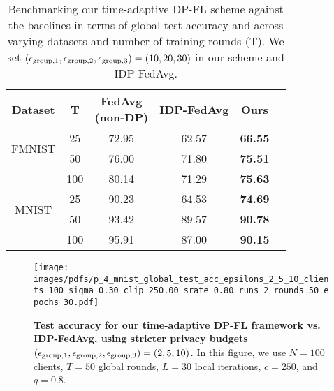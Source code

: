 {\begin{table}[h!]
\centering
\caption{
{Benchmarking our time-adaptive DP-FL scheme against the baselines in terms of global test accuracy and across varying datasets and number of training rounds (T). We set $({\epsilon}_{\text{group},1}, {\epsilon}_{\text{group},2}, {\epsilon}_{\text{group},3})=(10,20,30)$ in our scheme and IDP-FedAvg.}}
\small 
\setlength{\tabcolsep}{8pt} 
\renewcommand{\arraystretch}{1.2} 
\begin{tabular}{cccccc}
\toprule
\textbf{Dataset} & \textbf{T} & \makecell[tl]{\textbf{FedAvg} \\ (non-DP)} & \textbf{IDP-FedAvg} & \textbf{Ours}  \\ 
\midrule
\multirow{2}{*}{FMNIST} & 25 & 72.95 & 62.57  & \textbf{66.55} \\

& 50  & 76.00 & 71.80  & \textbf{75.51} \\  
                        & 100 & 80.14 & 71.29  & \textbf{75.63} \\  

                        
\midrule
\multirow{2}{*}{MNIST}  & 25  & 90.23 & 64.53  & \textbf{74.69} \\  

& 50  & 93.42 & 89.57  & \textbf{90.78} \\  
                        & 100 & 95.91 & 87.00  & \textbf{90.15} \\  
\bottomrule
\end{tabular}
\label{tab:clientstable_rounds}
\centering \vspace{-2ex}
\end{table}


\begin{figure}[!ht]
    \centering
    \vspace{5pt} 
        \centering
        \texttt{[image: images/pdfs/p\_4\_mnist\_global\_test\_acc\_epsilons\_2\_5\_10\_clients\_100\_sigma\_0.30\_clip\_250.00\_srate\_0.80\_runs\_2\_rounds\_50\_epochs\_30.pdf]} 
        \caption{\textbf{Test accuracy for our time-adaptive DP-FL framework vs. IDP-FedAvg, using stricter privacy budgets $({\epsilon}_{\text{group},1},{\epsilon}_{\text{group},2},{\epsilon}_{\text{group},3})=(2,5,10)$.} In this figure, we use $N=100$ clients, $T=50$ global rounds, $L=30$ local iterations, $c=250$, and $q=0.8$.} 
        \label{fig:lowprivacybudgets}
\end{figure}


}
